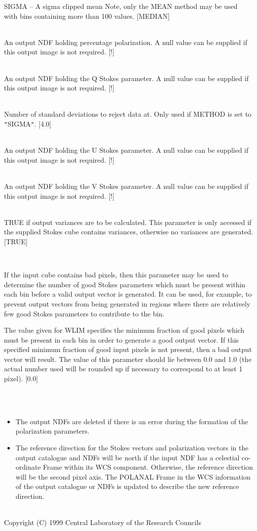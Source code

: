 \documentclass[twoside,11pt]{article}
\newcommand{\stardocinitials}  {SUN}
\newcommand{\stardocnumber}    {223.3}
\newcommand{\stardocname}{\stardocinitials /\stardocnumber}
\renewcommand{\_}{\texttt{\symbol{95}}}
\newcommand{\sstsubsection}[1]{ \item[{#1}] \mbox{} \\}
\newcommand{\sstnotes}[1]{\item[Notes:] \mbox{} \\[1.3ex] #1}
\newcommand{\sstdiytopic}[2]{\item[{\hspace{-0.35em}#1\hspace{-0.35em}:}]
\mbox{} \\[1.3ex] #2}
\newcommand{\sstitemlist}[1]{
  \mbox{} \\
  \vspace{-3.5ex}
  \begin{itemize}
     #1
  \end{itemize}
}
\newcommand{\sstitem}{\item}
\newcommand{\sstsubsection}[1]{\item[{#1}]}
\newcommand{\sstnotes}[1]{\item[Notes:] #1 }
\newcommand{\sstdiytopic}[2]{\item[{#1}] #2 }
\newcommand{\sstitemlist}[1]{
      \begin{itemize}
         #1
      \end{itemize}
      \\
   }
\newcommand{\sstitem}{\item}
\begin{document}
{{{{            \sstitem
               SIGMA     -- A sigma clipped mean
            Note, only the MEAN method may be used with bins containing more
            than 100 values. [MEDIAN]
         }
      }
      \sstsubsection{
         P = NDF (Write)
      }{
         An output NDF holding percentage polarization. A null value can be
         supplied if this output image is not required. [!]
      }
      \sstsubsection{
         Q = NDF (Write)
      }{
         An output NDF holding the Q Stokes parameter. A null value can be
         supplied if this output image is not required. [!]
      }
      \sstsubsection{
         SIGMAS = \_REAL (Read)
      }{
         Number of standard deviations to reject data at. Only used if
         METHOD is set to {\tt "}SIGMA{\tt "}. [4.0]
      }
      \sstsubsection{
         U = NDF (Write)
      }{
         An output NDF holding the U Stokes parameter. A null value can be
         supplied if this output image is not required. [!]
      }
      \sstsubsection{
         V = NDF (Write)
      }{
         An output NDF holding the V Stokes parameter. A null value can be
         supplied if this output image is not required. [!]
      }
      \sstsubsection{
         VARIANCE = \_LOGICAL (Read)
      }{
         TRUE if output variances are to be calculated.  This parameter
         is only accessed if the supplied Stokes cube contains variances,
         otherwise no variances are generated.  [TRUE]
      }
      \sstsubsection{
         WLIM = \_REAL (Read)
      }{
         If the input cube contains bad pixels, then this parameter
         may be used to determine the number of good Stokes parameters
         which must be present within each bin before a valid output vector
         is generated.  It can be used, for example, to prevent output
         vectors from being generated in regions where there are relatively
         few good Stokes parameters to contribute to the bin.

         The value given for WLIM specifies the minimum fraction of
         good pixels which must be present in each bin in order to
         generate a good output vector. If this specified minimum fraction
         of good input pixels is not present, then a bad output vector
         will result. The value of this parameter should lie between 0.0
         and 1.0 (the actual number used will be rounded up if necessary
         to correspond to at least 1 pixel). [0.0]
      }
   }
   \sstnotes{
      \sstitemlist{

         \sstitem
         The output NDFs are deleted if there is an error during the
         formation of the polarization parameters.

         \sstitem
         The reference direction for the Stokes vectors and polarization
         vectors in the output catalogue and NDFs will be north if the input NDF
         has a celestial co-ordinate Frame within its WCS component. Otherwise,
         the reference direction will be the second pixel axis. The POLANAL
         Frame in the WCS information of the output catalogue or NDFs is
         updated to describe the new reference direction.
      }
   }
   \sstdiytopic{
      Copyright
   }{
      Copyright (C) 1999 Central Laboratory of the Research Councils
   }
}
\newpage
\markboth{\stardocname}{\stardocname}
\end{document}
